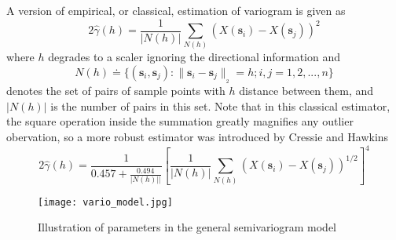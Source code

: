 \documentclass[english]{article}
\numberwithin{equation}{section}
\numberwithin{table}{section}
\numberwithin{figure}{section}
\newcommand{\norm}[2]{\|{#1}\|_{{}_{#2}}}
\newcommand{\bms}{\bm{s}}
\begin{document}
A version of empirical, or classical, estimation of variogram is given as
\begin{equation} \label{varioest0}
  2\hat{\gamma}(h) = \frac{1}{|N(h)|} \sum_{N(h)} \left( X(\bms_i)
  - X(\bms_j) \right)^2 
\end{equation}
where $h$ degrades to a scaler ignoring the directional information and 
\begin{equation} \label{Nhdef}
  N(h) \doteq \{ (\bms_i, \bms_j) : \norm{\bms_i - \bms_j}{2} = h; i,j = 1,2,...,n \}
\end{equation}
denotes the set of pairs of sample points with $h$ distance between
them, and $|N(h)|$ is the number of pairs in this set. Note that in
this classical estimator, the square operation inside the summation
greatly magnifies any outlier obervation, so a more robust estimator
was introduced by Cressie and Hawkins\cite{Cressie93}
\begin{equation} \label{varioest1}
  2\hat{\gamma}(h) = \frac{1}{0.457+\frac{0.494}{|N(h)||}}\left[\frac{1}{|N(h)|}
  \sum_{N(h)} (X(\bms_i) - X(\bms_j))^{1/2}\right]^4
\end{equation}


\begin{figure} \centering
  \texttt{[image: vario\_model.jpg]}
  \caption{Illustration of parameters in the general semivariogram model}
  \label{vario_model}
\end{figure}
\end{document}
